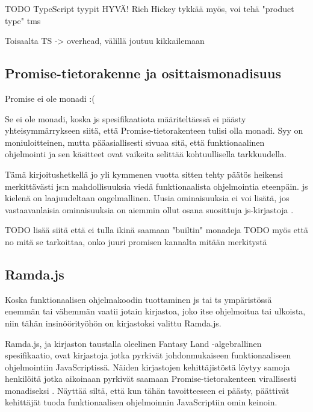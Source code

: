 TODO TypeScript tyypit HYVÄ! Rich Hickey tykkää myös, voi tehä "product type" tms

Toisaalta TS -> overhead, välillä joutuu kikkailemaan

\subsection{Promise-tietorakenne ja osittaismonadisuus}

Promise ei ole monadi :( \cite{read-it-later-11481,promises-spec-94}

Se ei ole monadi, koska \gls{js} spesifikaatiota määriteltäessä ei päästy yhteisymmärrykseen siitä, että Promise-tietorakenteen tulisi olla monadi. Syy on moniuloitteinen, mutta pääasiallisesti sivuaa sitä, että funktionaalinen ohjelmointi ja sen käsitteet ovat vaikeita selittää kohtuullisella tarkkuudella. \citep{promises-spec-94}

Tämä kirjoitushetkellä jo yli kymmenen vuotta sitten tehty päätös heikensi merkittävästi \gls{js}:n mahdollisuuksia viedä funktionaalista ohjelmointia eteenpäin. \Gls{js} kielenä on laajuudeltaan ongelmallinen. Uusia ominaisuuksia ei voi lisätä, jos vastaavanlaisia ominaisuuksia on aiemmin ollut osana suosittuja \gls{js}-kirjastoja \cite{proposal-joint-iteration,prototype_library_trends}.

TODO lisää siitä että ei tulla ikinä saamaan "builtin" monadeja
TODO myös että no mitä se tarkoittaa, onko juuri promisen kannalta mitään merkitystä

\subsection{Ramda.js}

Koska funktionaalisen ohjelmakoodin tuottaminen \gls{js} tai \gls{ts} ympäristössä enemmän tai vähemmän vaatii jotain kirjastoa, joko itse ohjelmoitua tai ulkoista, niin tähän insinöörityöhön on kirjastoksi valittu Ramda.js.

Ramda.js, ja kirjaston taustalla oleelinen Fantasy Land -algebrallinen spesifikaatio, ovat kirjastoja jotka pyrkivät johdonmukaiseen funktionaaliseen ohjelmointiin JavaScriptissä. Näiden kirjastojen kehittäjistöstä löytyy samoja henkilöitä jotka aikoinaan pyrkivät saamaan Promise-tietorakenteen virallisesti monadiseksi \cite{ramda:contributors,fantasy-land:contributors,promises-spec-94}. Näyttää siltä, että kun tähän tavoitteeseen ei päästy, päättivät kehittäjät tuoda funktionaalisen ohjelmoinnin JavaScriptiin omin keinoin.

